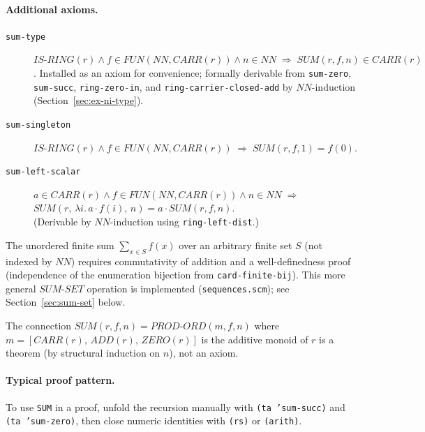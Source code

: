 \paragraph{Additional axioms.}
\begin{description}
\item[\texttt{sum-type}]
  $\mathit{IS\text{-}RING}(r) \wedge f \in \mathit{FUN}(\mathit{NN}, \mathit{CARR}(r))
  \wedge n \in \mathit{NN} \;\Rightarrow\; \mathit{SUM}(r, f, n) \in \mathit{CARR}(r)$.
  Installed as an axiom for convenience; formally derivable from
  \texttt{sum-zero}, \texttt{sum-succ}, \texttt{ring-zero-in},
  and \texttt{ring-carrier-closed-add} by $\mathit{NN}$-induction
  (Section~\ref{sec:ex-ni-type}).

\item[\texttt{sum-singleton}]
  $\mathit{IS\text{-}RING}(r) \wedge f \in \mathit{FUN}(\mathit{NN}, \mathit{CARR}(r))
  \;\Rightarrow\; \mathit{SUM}(r, f, 1) = f(0)$.

\item[\texttt{sum-left-scalar}]
  $a \in \mathit{CARR}(r) \wedge f \in \mathit{FUN}(\mathit{NN}, \mathit{CARR}(r))
  \wedge n \in \mathit{NN} \;\Rightarrow\;$\\
  $\mathit{SUM}(r,\, \lambda i.\, a \cdot f(i),\, n)
  = a \cdot \mathit{SUM}(r, f, n)$.\\
  (Derivable by $\mathit{NN}$-induction using \texttt{ring-left-dist}.)
\end{description}

\begin{remark}
The unordered finite sum $\sum_{x \in S} f(x)$ over an arbitrary finite
set $S$ (not indexed by $\mathit{NN}$) requires commutativity of
addition and a well-definedness proof (independence of the enumeration
bijection from \texttt{card-finite-bij}).  This more general
$\mathit{SUM\text{-}SET}$ operation is implemented (\texttt{sequences.scm}); see
Section~\ref{sec:sum-set} below.
\end{remark}

\begin{remark}
The connection $\mathit{SUM}(r, f, n) = \mathit{PROD\text{-}ORD}(m, f, n)$
where $m = [\mathit{CARR}(r),\, \mathit{ADD}(r),\, \mathit{ZERO}(r)]$ is the
additive monoid of $r$ is a theorem (by structural induction on $n$),
not an axiom.
\end{remark}

\paragraph{Typical proof pattern.}
To use \texttt{SUM} in a proof, unfold the recursion manually with
\texttt{(ta 'sum-succ)} and \texttt{(ta 'sum-zero)}, then close
numeric identities with \texttt{(rs)} or \texttt{(arith)}.

